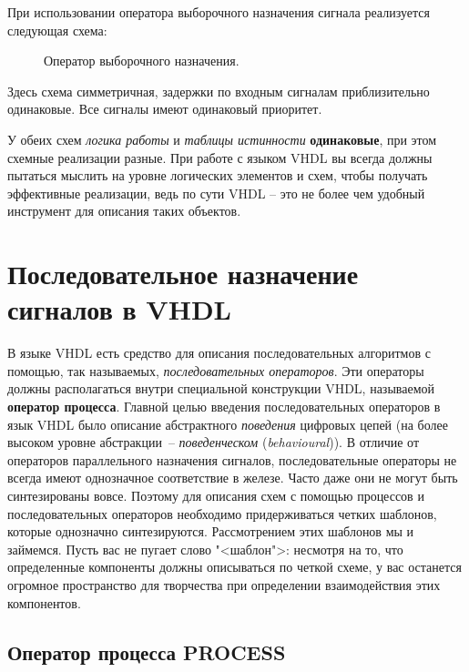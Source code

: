 При использовании оператора выборочного назначения сигнала реализуется следующая схема:

\begin{figure}[ht]
\centering
{}
\caption{Оператор выборочного назначения.}
\label{case_hard}
\end{figure}

Здесь схема симметричная, задержки по входным сигналам приблизительно одинаковые. Все сигналы имеют одинаковый приоритет.

У обеих схем \emph{логика работы} и \emph{таблицы истинности} \textbf{одинаковые}, при этом схемные реализации разные. При работе с языком VHDL вы всегда должны пытаться мыслить на уровне логических элементов и схем, чтобы получать эффективные реализации, ведь по сути VHDL – это не более чем удобный инструмент для описания таких объектов. 

\section{Последовательное назначение сигналов в VHDL}

В языке VHDL есть средство для описания последовательных алгоритмов с помощью, так называемых, \emph{последовательных операторов}. Эти операторы должны располагаться внутри специальной конструкции VHDL, называемой \textbf{оператор процесса}. Главной целью введения последовательных операторов в язык VHDL было описание абстрактного \emph{поведения} цифровых цепей (на более высоком уровне абстракции~-- \emph{поведенческом} (\emph{behavioural})). В отличие от операторов параллельного назначения сигналов, последовательные операторы не всегда имеют однозначное соответствие в железе. Часто даже они не могут быть синтезированы вовсе. Поэтому для описания схем с помощью процессов и последовательных операторов необходимо придерживаться четких шаблонов, которые однозначно синтезируются. Рассмотрением этих шаблонов мы и займемся. Пусть вас не пугает слово "<шаблон">: несмотря на то, что определенные компоненты должны описываться по четкой схеме, у вас останется огромное пространство для творчества при определении взаимодействия этих компонентов. 

\subsection{Оператор процесса PROCESS}

